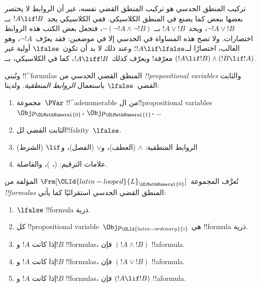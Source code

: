 \documentclass[../../../include/open-logic-section]{subfiles}
\begin{document}


تركيب المنطق الحدسي هو تركيب المنطق القضي نفسه، غير أن الروابط لا يختصر
بعضها ببعض كما يصنع في المنطق الكلاسيكي. ففي الكلاسيكي يحد~$!A \lif !B$
بــ$\lnot !A \lor !B$، ويحد~$!A \lor !B$ بــ
$\lnot(\lnot !A \land \lnot !B)$، فتجعل بعض الكتب هذه الروابط اختصارات.
ولا تصح هذه المساواة في الحدسي إلا في موضعين: فقد يعرّف~$\lnot !A$، وهو
الغالب، اختصارًا لــ$!A \lif \lfalse$؛ وعند ذلك لا بد أن تكون~$\lfalse$
أولية غير معرّفة!{} ويعرّف كذلك~$!A \liff !B$، كما في الكلاسيكي، بــ
$(!A \lif !B) \land (!B \lif !A)$.

وتُبنى !!^{formula}s المنطق القضي الحدسي من
\emph{!!{propositional variable}s} والثابت القضي~$\lfalse$ باستعمال
\emph{الروابط المنطقية}. ولدينا:

\begin{enumerate}
\item مجموعة~$\PVar$ !!^a{denumerable} من ال!!{propositional variable}s
  $\Obj p_\OLMathNumeral{0}$، $\Obj p_\OLMathNumeral{1}$، \dots
  \item الثابت القضي لل!!{falsity}~$\lfalse$.
\item الروابط المنطقية: $\land$
  (العطف)، و$\lor$ (الفصل)، و$\lif$ (الشرط)
\item علامات الترقيم: (، )، والفاصلة.
\end{enumerate}

\begin{defn}[الصيغة]
 تُعرَّف المجموعة~$\Frm[\OLId{latin-looped}{L}_\OLMathNumeral{0}]$ المؤلفة من
\emph{!!{formula}s} المنطق القضي الحدسي استقرائيًا كما يأتي:
\begin{enumerate}
\item $\lfalse$ !!{formula} ذرية.

\item كل !!{propositional variable}~$\Obj p_\OLId{latin-ordinary}{i}$ هي !!{formula} ذرية.

\item إذا كانت $!A$ و$!B$ !!{formula}s، فإن $(!A \land
  !B)$ !!a{formula}.

\item إذا كانت $!A$ و$!B$ !!{formula}s، فإن $(!A \lor !B)$
  !!a{formula}.

\item إذا كانت $!A$ و$!B$ !!{formula}s، فإن $(!A \lif !B)$
  !!a{formula}.

\end{enumerate}
\end{defn}
\end{document}

